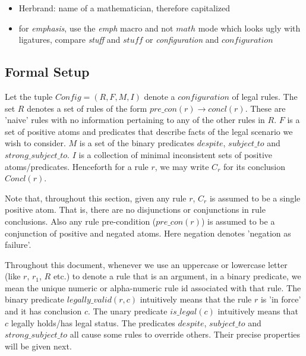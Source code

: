 \begin{itemize}
    \item Herbrand: name of a mathematician, therefore capitalized
    \item for \emph{emphasis}, use the \emph{emph} macro and not $math$ mode which looks ugly with ligatures, compare \emph{stuff} and $stuff$ or \emph{configuration} and $configuration$
\end{itemize}



\subsection{Formal Setup}
Let the tuple $Config = (R,F,M,I)$ denote a $configuration$ of legal rules. The set $R$ denotes a set of rules of the form $pre\_con(r)\rightarrow concl(r)$. These are 'naive' rules with no information pertaining to any of the other rules in $R$. $F$ is a set of positive atoms and predicates that describe facts of the legal scenario we wish to consider. $M$ is a set of the binary predicates $despite$, $subject\_to$ and $strong\_subject\_to$. $I$ is a collection of minimal inconsistent sets of positive atoms/predicates. Henceforth for a rule $r$, we may write $C_{r}$ for its conclusion $Concl(r)$. 

Note that, throughout this section, given any rule $r$, $C_{r}$ is assumed to be a single positive atom. That is, there are no disjunctions or conjunctions in rule conclusions. Also any rule pre-condition ($pre\_con(r)$) is assumed to be a conjunction of positive and negated atoms. Here negation denotes 'negation as failure'.  

Throughout this document, whenever we use an uppercase or lowercase letter (like $r$, $r_{1}$, $R$ etc.) to denote a rule that is an argument, in a binary predicate, we mean the unique numeric or alpha-numeric rule id associated with that rule. The binary predicate $legally\_valid(r,c)$ intuitively means that the rule $r$ is 'in force' and it has conclusion $c$. The unary predicate $is\_legal(c)$ intuitively means that $c$ legally holds/has legal status. The predicates $despite$, $subject\_to$ and $strong\_subject\_to$ all cause some rules to override others. Their precise properties will be given next.


